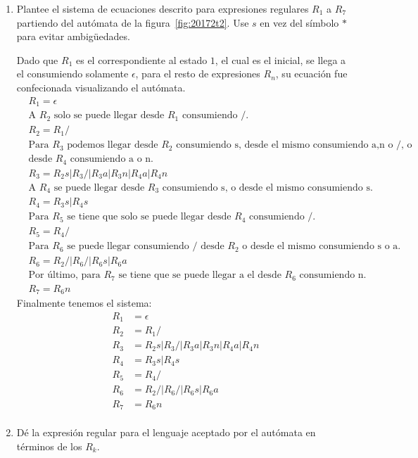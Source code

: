 \documentclass[spanish, fleqn]{article}
\begin{document}
  \begin{enumerate}
  \item %
    Plantee el sistema de ecuaciones descrito
    para expresiones regulares \(R_1\) a \(R_7\)
    partiendo del autómata de la figura~\ref{fig:20172t2}.
    Use \(s\) en vez del símbolo \(*\) para evitar ambigüedades.
    
    Dado que $R_{1}$ es el correspondiente al estado $1$, el cual es el inicial, se llega a el consumiendo solamente $\epsilon$, para el resto de expresiones $R_{n}$, su ecuación fue confecionada visualizando el autómata. 
    \begin{align*}
    &R_{1}=\epsilon \\
    &\text{A $R_2$ solo se puede llegar desde $R_1$ consumiendo /.}\\
    &R_{2}=R_{1}/\\
    &\text{Para $R_3$ podemos llegar desde $R_2$ consumiendo s, desde el mismo consumiendo a,n o /, o}\\
    &\text{desde $R_4$ consumiendo a o n.}\\
    &R_{3}=R_{2}s|R_{3}/|R_{3}a|R_{3}n|R_{4}a|R_{4}n\\
    &\text{A $R_4$ se puede llegar desde $R_3$ consumiendo s, o desde el mismo consumiendo s.}\\
    &R_{4}=R_{3}s|R_{4}s
    \end{align*}
    \begin{align*}
    &\text{Para $R_5$ se tiene que solo se puede llegar desde $R_4$ consumiendo /.}\\
    &R_{5}=R_{4}/\\
    &\text{Para $R_6$ se puede llegar consumiendo / desde $R_2$ o desde el mismo consumiendo s o a.}\\
    &R_{6}=R_{2}/|R_{6}/|R_{6}s|R_{6}a\\
    &\text{Por último, para $R_7$ se tiene que se puede llegar a el desde $R_6$ consumiendo n.}\\
    &R_{7}=R_{6}n
    \end{align*}
    Finalmente tenemos el sistema:
    \begin{align*}
    R_{1}&=\epsilon \\
    R_{2}&=R_{1}/\\
    R_{3}&=R_{2}s|R_{3}/|R_{3}a|R_{3}n|R_{4}a|R_{4}n\\
    R_{4}&=R_{3}s|R_{4}s\\
    R_{5}&=R_{4}/\\
    R_{6}&=R_{2}/|R_{6}/|R_{6}s|R_{6}a\\
    R_{7}&=R_{6}n\\
	\end{align*}
  \item %
    \label{ques:20172t2p2}
    Dé la expresión regular para el lenguaje aceptado por el autómata
    en términos de los \(R_k\).
    

\end{enumerate}
\end{document}
